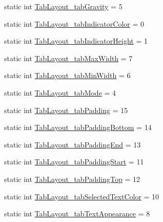 \begin{DoxyCompactItemize}
\item 
static int \hyperlink{classandroid_1_1support_1_1v7_1_1appcompat_1_1R_1_1styleable_aabd9dc95552ef0c47cbf137217540f2e}{Tab\+Layout\+\_\+tab\+Gravity} = 5
\item 
static int \hyperlink{classandroid_1_1support_1_1v7_1_1appcompat_1_1R_1_1styleable_a8c08dea36fe43fa447fca13e8dbb0fb8}{Tab\+Layout\+\_\+tab\+Indicator\+Color} = 0
\item 
static int \hyperlink{classandroid_1_1support_1_1v7_1_1appcompat_1_1R_1_1styleable_a2170d61ffaf8518ee80c93d8af20f026}{Tab\+Layout\+\_\+tab\+Indicator\+Height} = 1
\item 
static int \hyperlink{classandroid_1_1support_1_1v7_1_1appcompat_1_1R_1_1styleable_aa2ea2744277660540a1c51be56abcd62}{Tab\+Layout\+\_\+tab\+Max\+Width} = 7
\item 
static int \hyperlink{classandroid_1_1support_1_1v7_1_1appcompat_1_1R_1_1styleable_a5b1f2d52d72419e4e3a54aaae5581f99}{Tab\+Layout\+\_\+tab\+Min\+Width} = 6
\item 
static int \hyperlink{classandroid_1_1support_1_1v7_1_1appcompat_1_1R_1_1styleable_a33c64cec340e2fdc2aa5d7139637c920}{Tab\+Layout\+\_\+tab\+Mode} = 4
\item 
static int \hyperlink{classandroid_1_1support_1_1v7_1_1appcompat_1_1R_1_1styleable_a97f140ed7f4cb71b4c00309d063b2aa7}{Tab\+Layout\+\_\+tab\+Padding} = 15
\item 
static int \hyperlink{classandroid_1_1support_1_1v7_1_1appcompat_1_1R_1_1styleable_acff2ca0891fae17b26046ac2678216ac}{Tab\+Layout\+\_\+tab\+Padding\+Bottom} = 14
\item 
static int \hyperlink{classandroid_1_1support_1_1v7_1_1appcompat_1_1R_1_1styleable_a82bcf12542227711510855ac622ef61d}{Tab\+Layout\+\_\+tab\+Padding\+End} = 13
\item 
static int \hyperlink{classandroid_1_1support_1_1v7_1_1appcompat_1_1R_1_1styleable_a4035abeaff701951ad7db51385d68554}{Tab\+Layout\+\_\+tab\+Padding\+Start} = 11
\item 
static int \hyperlink{classandroid_1_1support_1_1v7_1_1appcompat_1_1R_1_1styleable_aba4947a78faa7f4241585dfd200d7bd1}{Tab\+Layout\+\_\+tab\+Padding\+Top} = 12
\item 
static int \hyperlink{classandroid_1_1support_1_1v7_1_1appcompat_1_1R_1_1styleable_a626aef8a758ebfe276a9f430c531fd6f}{Tab\+Layout\+\_\+tab\+Selected\+Text\+Color} = 10
\item 
static int \hyperlink{classandroid_1_1support_1_1v7_1_1appcompat_1_1R_1_1styleable_a7ee7e0ba38afd5264e1ff4cd29c5d183}{Tab\+Layout\+\_\+tab\+Text\+Appearance} = 8

\end{DoxyCompactItemize}

